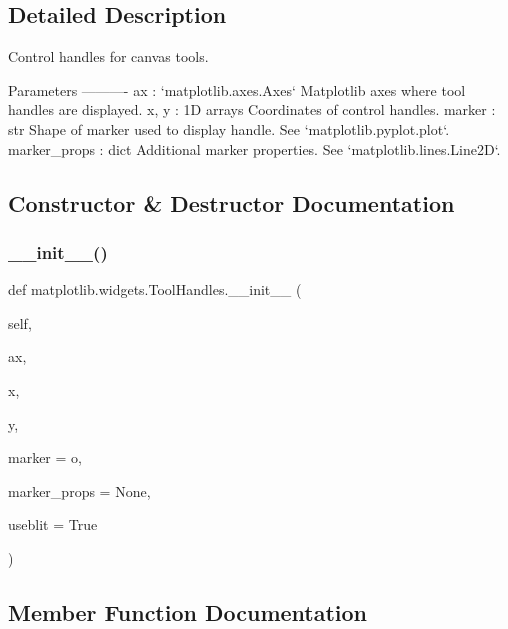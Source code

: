 \subsection{Detailed Description}
\begin{DoxyVerb}Control handles for canvas tools.

Parameters
----------
ax : `matplotlib.axes.Axes`
    Matplotlib axes where tool handles are displayed.
x, y : 1D arrays
    Coordinates of control handles.
marker : str
    Shape of marker used to display handle. See `matplotlib.pyplot.plot`.
marker_props : dict
    Additional marker properties. See `matplotlib.lines.Line2D`.
\end{DoxyVerb}
 

\subsection{Constructor \& Destructor Documentation}
\mbox{\label{classmatplotlib_1_1widgets_1_1ToolHandles_aab9672bad5c820994388555d895f63fa}} 
\subsubsection{\texorpdfstring{\+\_\+\+\_\+init\+\_\+\+\_\+()}{\_\_init\_\_()}}
{\footnotesize\ttfamily def matplotlib.\+widgets.\+Tool\+Handles.\+\_\+\+\_\+init\+\_\+\+\_\+ (\begin{DoxyParamCaption}\item[{}]{self,  }\item[{}]{ax,  }\item[{}]{x,  }\item[{}]{y,  }\item[{}]{marker = {\ttfamily \textquotesingle{}o\textquotesingle{}},  }\item[{}]{marker\+\_\+props = {\ttfamily None},  }\item[{}]{useblit = {\ttfamily True} }\end{DoxyParamCaption})}



\subsection{Member Function Documentation}
\mbox{\label{classmatplotlib_1_1widgets_1_1ToolHandles_a083d2140d089354819f90853940a10cd}} 
